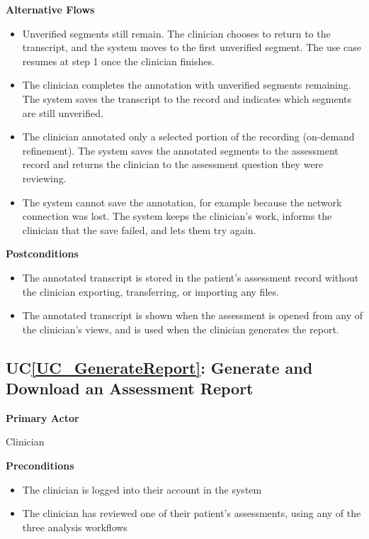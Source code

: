 \documentclass[12pt]{article}
\newcounter{ucnum} %
\newcommand{\ucref}[1]{UC\ref{#1}}
\begin{document}
\textbf{Alternative Flows}
\begin{itemize}
\item[2a.] Unverified segments still remain. The clinician chooses to return to the transcript, and the system moves to the first unverified segment. The use case resumes at step 1 once the clinician finishes.
\item[3a.] The clinician completes the annotation with unverified segments remaining. The system saves the transcript to the record and indicates which segments are still unverified.
\item[4a.] The clinician annotated only a selected portion of the recording (on-demand refinement). The system saves the annotated segments to the assessment record and returns the clinician to the assessment question they were reviewing.
\item[4b.] The system cannot save the annotation, for example because the network connection was lost. The system keeps the clinician’s work, informs the clinician that the save failed, and lets them try again.
\end{itemize}

\textbf{Postconditions}
\begin{itemize}
\item The annotated transcript is stored in the patient’s assessment record without the clinician exporting, transferring, or importing any files.
\item The annotated transcript is shown when the assessment is opened from any of the clinician’s views, and is used when the clinician generates the report.
\end{itemize}

 \label{UC_GenerateReport}
\subsection{\ucref{UC_GenerateReport}: Generate and Download an Assessment Report}

\textbf{Primary Actor}

Clinician

\textbf{Preconditions}
\begin{itemize}
\item The clinician is logged into their account in the system
\item The clinician has reviewed one of their patient’s assessments, using any of the three analysis workflows
\end{itemize}
\end{document}
